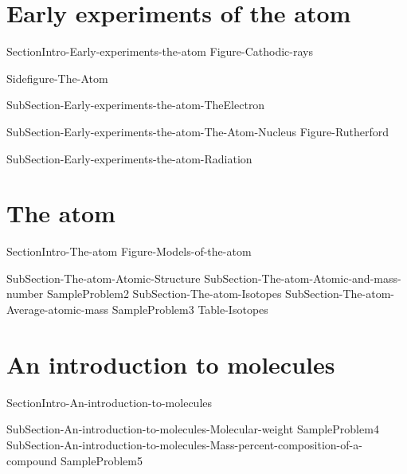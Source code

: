 \documentclass[main.tex]{subfiles}
\newcommand\chapterlabel{Ch-Table}\setcounter{figurenewcounter}{0}\setcounter{tablenewcounter}{0}\setcounter{formulanewcounter}{0}\chapterpicture{../{\chapterlabel}/figure1}\chapterpicturelabel{PxFuel}
\begin{document}
\section{Early experiments of the atom}
{SectionIntro-Early-experiments-the-atom}
{Figure-Cathodic-rays}
\sloppy\begin{description}
{Sidefigure-The-Atom}
\item[\docfilehook{Charge to mass ratio of an electron}{}] {SubSection-Early-experiments-the-atom-TheElectron}
\item[\docfilehook{The atom nucleus}{}] {SubSection-Early-experiments-the-atom-The-Atom-Nucleus}
{Figure-Rutherford}
\item[\docfilehook{Radiation}{}] {SubSection-Early-experiments-the-atom-Radiation}
\end{description}
 
\section{The atom}
{SectionIntro-The-atom}
 {Figure-Models-of-the-atom}
\sloppy\begin{description}
{SubSection-The-atom-Atomic-Structure}
{SubSection-The-atom-Atomic-and-mass-number}
{SampleProblem2}
{SubSection-The-atom-Isotopes}
{SubSection-The-atom-Average-atomic-mass}
{SampleProblem3}
 {Table-Isotopes}
\end{description}



\section{An introduction to molecules}%
{SectionIntro-An-introduction-to-molecules}%
\sloppy\begin{description}%
{SubSection-An-introduction-to-molecules-Molecular-weight}%
{SampleProblem4}%
{SubSection-An-introduction-to-molecules-Mass-percent-composition-of-a-compound}%
{SampleProblem5}%
\end{description}%
\end{document}
